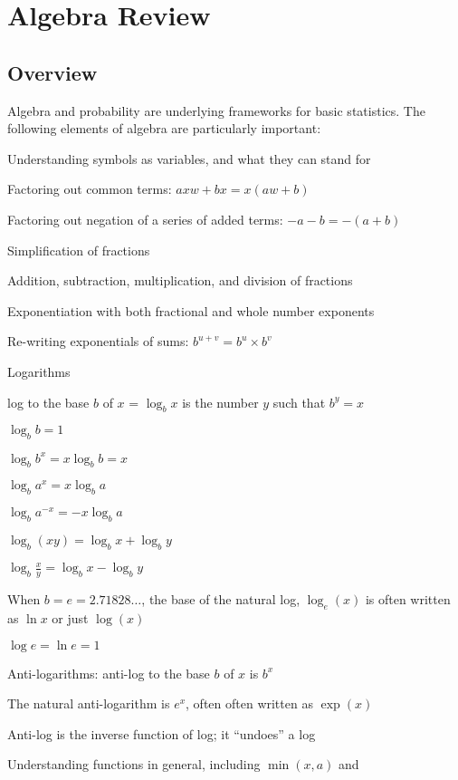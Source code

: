 \chapter{Algebra Review}
\section{Overview}
Algebra and probability are underlying frameworks for basic statistics.  The
following elements of algebra are particularly important:
\bi
\item Understanding symbols as variables, and what they can stand for
\item Factoring out common terms: $axw + bx = x(aw + b)$
\item Factoring out negation of a series of added terms: $-a - b = -
  (a + b)$
\item Simplification of fractions
\item Addition, subtraction, multiplication, and division of fractions
\item Exponentiation with both fractional and whole number exponents
\item Re-writing exponentials of sums: $b^{u + v} = b^{u}\times b^{v}$
\item Logarithms
 \bi
 \item log to the base $b$ of $x$ = $\log_{b}x$ is the number $y$ such
   that $b^{y} = x$ 
 \item $\log_{b}b = 1$
 \item $\log_{b}b^{x} = x \log_{b}b = x$
 \item $\log_{b}a^{x} = x \log_{b}a$
 \item $\log_{b}a^{-x} = -x \log_{b}a$
 \item $\log_{b}(xy) = \log_{b}x + \log_{b}y$
 \item $\log_{b}\frac{x}{y} = \log_{b}x - \log_{b}y$
 \item When $b = e = 2.71828\ldots$, the base of the natural log,
   $\log_{e}(x)$ is often written as $\ln{x}$ or just $\log(x)$
 \item $\log e = \ln e = 1$
 \ei
\item Anti-logarithms: anti-log to the base $b$ of $x$ is $b^{x}$
 \bi
 \item The natural anti-logarithm is $e^{x}$, often often written as
   $\exp(x)$
 \item Anti-log is the inverse function of log; it ``undoes'' a log
 \ei
\item Understanding functions in general, including $\min(x, a)$ and
